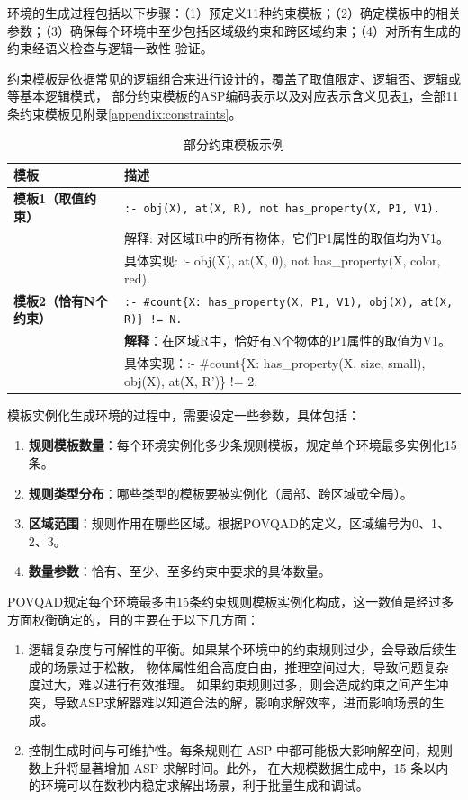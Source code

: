 环境的生成过程包括以下步骤：（1）预定义11种约束模板；（2）确定模板中的相关参数；（3）确保每个环境中至少包括区域级约束和跨区域约束；（4）对所有生成的约束经语义检查与逻辑一致性
验证。

约束模板是依据常见的逻辑组合来进行设计的，覆盖了取值限定、逻辑否、逻辑或等基本逻辑模式，
部分约束模板的ASP编码表示以及对应表示含义见表\ref{tab:asp_templates}，全部11条约束模板见附录\ref{appendix:constraints}。
\begin{table}[h]
    \centering
    \renewcommand{\arraystretch}{1.0}
    \begin{tabular}{|p{2.8cm}|p{12.2cm}|}
        \hline
        \textbf{模板} & \textbf{描述} \\
        \hline
        \textbf{模板1（取值约束）} & 
        \texttt{:- obj(X), at(X, R), not has\_property(X, P1, V1).} \\ 
        & 解释: 对区域R中的所有物体，它们P1属性的取值均为V1。 \\ 
        & 具体实现: :- obj(X), at(X, 0), not has\_property(X, color, red). \\
        \hline
        \textbf{模板2（恰有N个约束）} & 
        \texttt{:- \#count\{X: has\_property(X, P1, V1), obj(X), at(X, R)\} != N.} \\ 
        & \textbf{解释}：在区域R中，恰好有N个物体的P1属性的取值为V1。 \\ 
        & 具体实现：:- \#count\{X: has\_property(X, size, small), obj(X), at(X, R')\} != 2. \\
        \hline
    \end{tabular}
    \caption{部分约束模板示例}
    \label{tab:asp_templates}
\end{table}

模板实例化生成环境的过程中，需要设定一些参数，具体包括：
\begin{enumerate}[nosep]
\item \textbf{规则模板数量}：每个环境实例化多少条规则模板，规定单个环境最多实例化15条。
\item \textbf{规则类型分布}：哪些类型的模板要被实例化（局部、跨区域或全局）。
\item \textbf{区域范围}：规则作用在哪些区域。根据POVQAD的定义，区域编号为0、1、2、3。
\item \textbf{数量参数}：恰有、至少、至多约束中要求的具体数量。
\end{enumerate}

POVQAD规定每个环境最多由15条约束规则模板实例化构成，这一数值是经过多方面权衡确定的，目的主要在于以下几方面：
\begin{enumerate}[nosep]
\item 逻辑复杂度与可解性的平衡。如果某个环境中的约束规则过少，会导致后续生成的场景过于松散，
物体属性组合高度自由，推理空间过大，导致问题复杂度过大，难以进行有效推理。
如果约束规则过多，则会造成约束之间产生冲突，导致ASP求解器难以知道合法的解，影响求解效率，进而影响场景的生成。
\item 控制生成时间与可维护性。每条规则在 ASP 中都可能极大影响解空间，规则数上升将显著增加 ASP 求解时间。此外，
在大规模数据生成中，15 条以内的环境可以在数秒内稳定求解出场景，利于批量生成和调试。
\end{enumerate}

